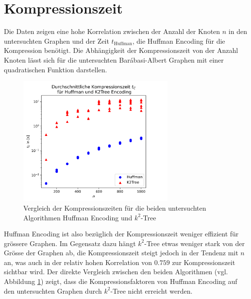 \documentclass{ffhsthesis}
\begin{document}
\section{Kompressionszeit}
Die Daten zeigen eine hohe Korrelation zwischen der Anzahl der Knoten $n$ in den untersuchten Graphen und der Zeit $t_{\text{Huffman}}$, die Huffman Encoding für die Kompression benötigt. Die Abhängigkeit der Kompressionszeit von der Anzahl Knoten lässt sich für die untersuchten Barábasi-Albert Graphen mit einer quadratischen Funktion darstellen.
\begin{figure}[H]
    \centering
    \includegraphics[width=0.7\textwidth]{images/average_time_2d_filtered_comparison_same_plot.png}
    \caption{Vergleich der Kompressionszeiten für die beiden untersuchten Algorithmen Huffman Encoding und $k^2$-Tree}
    \label{fig:compression_time-vergleich}
\end{figure}
 Huffman Encoding ist also bezüglich der Kompressionszeit weniger effizient für grössere Graphen. Im Gegensatz dazu hängt $k^2$-Tree etwas weniger stark von der Grösse der Graphen ab, die Kompressionszeit steigt jedoch in der Tendenz mit $n$ an, was auch in der relativ hohen Korrelation von $0.759$ zur Kompressionszeit sichtbar wird. Der direkte Vergleich zwischen den beiden Algorithmen (vgl. Abbildung \ref{fig:compression_time-vergleich}) zeigt, dass die Kompressionsfaktoren von Huffman Encoding auf den untersuchten Graphen durch $k^2$-Tree nicht erreicht werden. 
\end{document}
